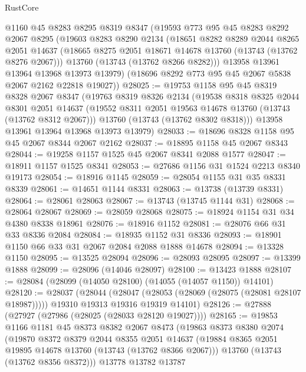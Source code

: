 \begin{lexlean}{RustCore}
\begin{coremodule}
    @1160
    @45
    @8283
    @8295
    @8319
    @8347
    (@19593
      @773
      @95
      @45
      @8283
      @8292
      @2067
      @8295
      (@19603
        @8283
        @8290
        @2134
        (@18651
          @8282
          @8289
          @2044
          @8265
          @2051
          @14637
          (@18665 @8275 @2051 @18671 @14678 @13760 (@13743 (@13762 @8276 @2067)))
          @13760
          (@13743 (@13762 @8266 @8282)))
        @13958
        @13961
        @13964
        @13968
        @13973
        @13979)
      (@18696 @8292 @773 @95 @45 @2067 @5838 @2067 @2162 @22818 @19027))
@28025 := @19753
    @1158
    @95
    @45
    @8319
    @8328
    @2067
    @8347
    (@19763
      @8319
      @8326
      @2134
      (@19538
        @8318
        @8325
        @2044
        @8301
        @2051
        @14637
        (@19552 @8311 @2051 @19563 @14678 @13760 (@13743 (@13762 @8312 @2067)))
        @13760
        (@13743 (@13762 @8302 @8318)))
      @13958
      @13961
      @13964
      @13968
      @13973
      @13979)
@28033 := @18696 @8328 @1158 @95 @45 @2067 @8344 @2067 @2162
@28037 := @18895 @1158 @45 @2067 @8343
@28044 := @19258 @1157 @1525 @45 @2067 @8341 @2088 @1577
@28047 := @18911 @1157 @1525 @8341
@28053 := @27686 @1156 @31 @1524 @2213 @8340 @19173
@28054 := @18916 @1145
@28059 := @28054 @1155 @31 @35 @8331 @8339
@28061 := @14651 @1144 @8331
@28063 := @13738 (@13739 @8331)
@28064 := @28061 @28063
@28067 := @13743 (@13745 @1144 @31)
@28068 := @28064 @28067
@28069 := @28059 @28068
@28075 := @18924 @1154 @31 @34 @4380 @8338 @18961
@28076 := @18916 @1152
@28081 := @28076 @66 @31 @33 @8336 @2084
@28084 := @18935 @1152 @31 @8336
@28093 := @18901 @1150 @66 @33 @31 @2067 @2084 @2088 @1888 @14678
@28094 := @13328 @1150
@28095 := @13525 @28094
@28096 := @28093 @28095
@28097 := @13399 @1888
@28099 := @28096 (@14046 @28097)
@28100 := @13423 @1888
@28107 := @28084 (@28099 (@14050 @28100) (@14055 (@14057 @1150)) @14101)
@28120 := @28037
    (@28044
      (@28047 (@28053 (@28069 (@28075 (@28081 @28107 @18987)))))
      @19310
      @19313
      @19316
      @19319
      @14101)
@28126 := @27888 (@27927 (@27986 (@28025 (@28033 @28120 @19027))))
@28165 := @19853
    @1166
    @1181
    @45
    @8373
    @8382
    @2067
    @8473
    (@19863
      @8373
      @8380
      @2074
      (@19870
        @8372
        @8379
        @2044
        @8355
        @2051
        @14637
        (@19884 @8365 @2051 @19895 @14678 @13760 (@13743 (@13762 @8366 @2067)))
        @13760
        (@13743 (@13762 @8356 @8372)))
      @13778
      @13782
      @13787

\end{coremodule}
\end{lexlean}
